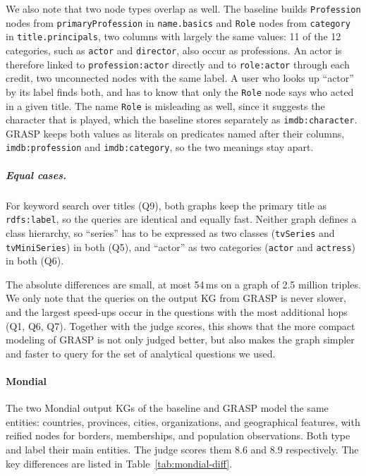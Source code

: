 We also note that two node types overlap as well. The baseline builds \texttt{Profession} nodes from \texttt{primaryProfession} in \texttt{name.basics} and \texttt{Role} nodes from \texttt{category} in \texttt{title.principals}, two columns with largely the same values: 11 of the 12 categories, such as \texttt{actor} and \texttt{director}, also occur as professions. An actor is therefore linked to \texttt{profession:actor} directly and to \texttt{role:actor} through each credit, two unconnected nodes with the same label. A user who looks up ``actor'' by its label finds both, and has to know that only the \texttt{Role} node says who acted in a given title. The name \texttt{Role} is misleading as well, since it suggests the character that is played, which the baseline stores separately as \texttt{imdb:character}. GRASP keeps both values as literals on predicates named after their columns, \texttt{imdb:profession} and \texttt{imdb:category}, so the two meanings stay apart.

\subparagraph{Equal cases.}
For keyword search over titles (Q9), both graphs keep the primary title as \texttt{rdfs:label}, so the queries are identical and equally fast. Neither graph defines a class hierarchy, so ``series'' has to be expressed as two classes (\texttt{tvSeries} and \texttt{tvMiniSeries}) in both (Q5), and ``actor'' as two categories (\texttt{actor} and \texttt{actress}) in both (Q6).

The absolute differences are small, at most 54\,ms on a graph of 2.5 million triples. We only note that the queries on the output KG from GRASP is never slower, and the largest speed-ups occur in the questions with the most additional hops (Q1, Q6, Q7). Together with the judge scores, this shows that the more compact modeling of GRASP is not only judged better, but also makes the graph simpler and faster to query for the set of analytical questions we used.

\paragraph{Mondial}\label{sec:results-mondial}
The two Mondial output KGs of the baseline and GRASP model the same entities: countries, provinces, cities, organizations, and geographical features, with reified nodes for borders, memberships, and population observations. Both type and label their main entities. The judge scores them 8.6 and 8.9 respectively. The key differences are listed in Table~\ref{tab:mondial-diff}.

